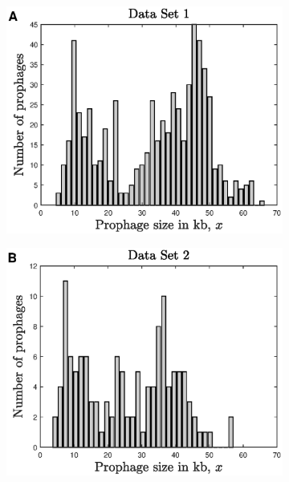 \begin{figure}[H]
    \centering
    \begin{subfigure}[t]{0.45\textwidth}
    \includegraphics[scale=0.55]{bobbar}
    \end{subfigure}\hfill
    \begin{subfigure}[t]{0.45\textwidth}
    \includegraphics[scale=0.55]{desubar.eps}
    \end{subfigure}\hfill

\end{figure}
